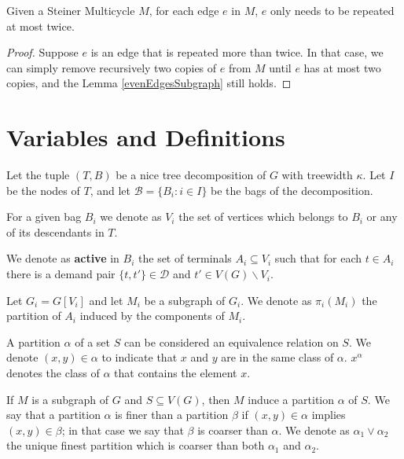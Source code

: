 \begin{corollary}\label{evenEdgesSubgraphCorollary}
Given a Steiner Multicycle \(M\), for each edge \(e\) in \(M\), \(e\) only needs to be repeated at most twice.
\end{corollary}
\begin{proof}
Suppose \(e\) is an edge that is repeated more than twice. In that case, we can simply remove recursively two copies of \(e\) from \(M\) until \(e\) has at most two copies, and the Lemma \ref{evenEdgesSubgraph} still holds.
\end{proof}


\section{Variables and Definitions}

Let the tuple \((T, B)\) be a nice tree decomposition of \(G\) with treewidth \(\kappa\). Let \(I\) be the nodes of \(T\), and let \(\mathcal{B} = \{B_i \colon i \in I\}\) be the bags of the decomposition.

For a given bag \(B_i\) we denote as \(V_i\) the set of vertices which belongs to \(B_i\) or any of its descendants in \(T\).

We denote as \textbf{active} in \(B_i\) the set of terminals \(A_i \subseteq V_i\) such that for each \(t \in A_i\) there is a demand pair \(\{t, t'\} \in \mathcal{D}\) and \(t' \in V(G)\backslash V_i\).


Let \(G_i = G[V_i]\) and let \(M_i\) be a subgraph of \(G_i\). We denote as \(\pi_i(M_i)\) the partition of \(A_i\) induced by the components of \(M_i\).

A partition \(\alpha\) of a set \(S\) can be considered an equivalence relation on \(S\). We denote \((x, y) \in \alpha\) to indicate that \(x\) and \(y\) are in the same class of \(\alpha\). \(x^\alpha\) denotes the class of \(\alpha\) that contains the element \(x\).

If \(M\) is a subgraph of \(G\) and \(S \subseteq V(G)\), then \(M\) induce a partition \(\alpha\) of \(S\). We say that a partition \(\alpha\) is finer than a partition \(\beta\) if \((x, y) \in \alpha\) implies \((x, y) \in \beta\); in that case we say that \(\beta\) is coarser than \(\alpha\). We denote as \(\alpha_1 \vee \alpha_2\) the unique finest partition which is coarser than both \(\alpha_1\) and \(\alpha_2\).

